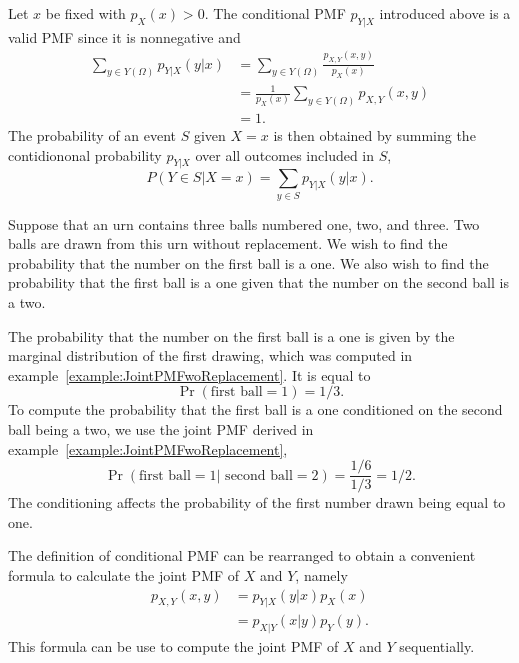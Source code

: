 Let $x$ be fixed with $p_X (x) > 0$.
The conditional PMF $p_{Y|X}$ introduced above is a valid PMF since it is nonnegative and
\begin{equation*}
\begin{split}
\sum_{y \in Y(\Omega)} p_{Y|X} (y|x)
&= \sum_{y \in Y(\Omega)} \frac{p_{X,Y} (x,y)}{p_X (x)} \\
&= \frac{1}{p_X (x)} \sum_{y \in Y(\Omega)} p_{X,Y} (x,y) \\
&= 1.
\end{split}
\end{equation*}
The probability of an event $S$ given $X = x$ is then obtained by summing the contidiononal probability $p_{Y|X}$ over all outcomes included in $S$,
\begin{equation*}
P (Y \in S | X = x) = \sum_{y \in S} p_{Y|X} (y | x) .
\end{equation*}

\begin{example}
Suppose that an urn contains three balls numbered one, two, and three.
Two balls are drawn from this urn without replacement.
We wish to find the probability that the number on the first ball is a one.
We also wish to find the probability that the first ball is a one given that the number on the second ball is a two.

The probability that the number on the first ball is a one is given by the marginal distribution of the first drawing, which was computed in example~\ref{example:JointPMFwoReplacement}.
It is equal to
\begin{equation*}
\Pr ( \text{first ball} = 1) = 1/3.
\end{equation*}
To compute the probability that the first ball is a one conditioned on the second ball being a two, we use the joint PMF derived in example~\ref{example:JointPMFwoReplacement},
\begin{equation*}
\Pr (\text{first ball} =1 | \text{ second ball} =2) = \frac{1/6}{1/3} = 1/2 .
\end{equation*}
The conditioning affects the probability of the first number drawn being equal to one.
\end{example}

The definition of conditional PMF can be rearranged to obtain a convenient formula to calculate the joint PMF of $X$ and $Y$, namely
\begin{equation*}
\begin{split}
p_{X,Y} (x,y) &= p_{Y|X} (y|x) p_X (x) \\
& = p_{X|Y} (x|y) p_Y (y) .
\end{split}
\end{equation*}
This formula can be use to compute the joint PMF of $X$ and $Y$ sequentially.

